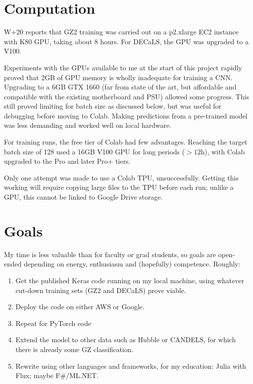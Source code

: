 \documentclass[preprint]{aastex631}
\begin{document}
\section{Computation} \label{sec:comp}

W+20 reports that GZ2 training was carried out on a p2.xlarge EC2 instance with K80 GPU, taking about 8 hours. For DECaLS, the GPU was upgraded to a V100.

Experiments with the GPUs available to me at the start of this project rapidly proved that 2GB of GPU memory is wholly inadequate for training a CNN. Upgrading to a 6GB GTX 1660 (far from state of the art, but affordable and compatible with the existing motherboard and PSU) allowed some progress. This still proved limiting for batch size as discussed below, but was useful for debugging before moving to Colab. Making predictions from a pre-trained model was less demanding and worked well on local hardware.

For training runs, the free tier of Colab had few advantages. Reaching the target batch size of 128 used a 16GB V100 GPU for long periods ($>12$h), with Colab upgraded to the Pro and later Pro+ tiers.

Only one attempt was made to use a Colab TPU, unsuccessfully. Getting this working will require copying large files to the TPU before each run; unlike a GPU, this cannot be linked to Google Drive storage.


\section{Goals} \label{sec:goals}

My time is less valuable than for faculty or grad students, so goals are open-ended depending on energy, enthusiasm and (hopefully) competence. Roughly:
\begin{enumerate}
	\item Get the published Keras code running on my local machine, using whatever cut-down training sets (GZ2 and DECaLS) prove viable.
	\item Deploy the code on either AWS or Google.
	\item Repeat for PyTorch code
	\item Extend the model to other data such as Hubble or CANDELS, for which there is already some GZ classification.
	\item Rewrite using other languages and frameworks, for my education: Julia with Flux; maybe F\#/ML.NET.
\end{enumerate}
\end{document}
